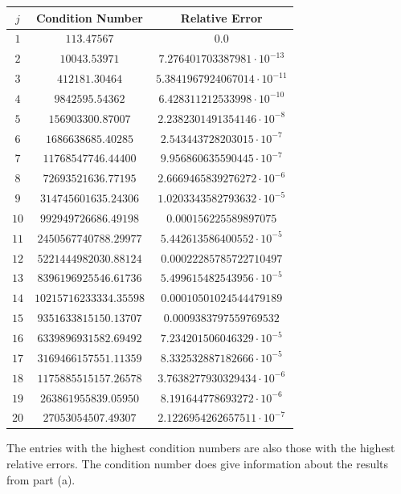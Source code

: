 \documentclass{article}
\begin{document}
\begin{center}
    \begin{tabular}{|c|c|c|}
        \hline
        $j$ & Condition Number & Relative Error \\
        \hline
        $1$ & $113.47567$ & $0.0$ \\
        \hline
        $2$ & $10043.53971$ & $7.276401703387981 \cdot 10^{-13}$ \\
        \hline
        $3$ & $412181.30464$ & $5.3841967924067014 \cdot 10^{-11}$ \\
        \hline
        $4$ & $9842595.54362$ & $6.428311212533998 \cdot 10^{-10}$ \\
        \hline
        $5$ & $156903300.87007$ & $2.2382301491354146 \cdot 10^{-8}$ \\
        \hline
        $6$ & $1686638685.40285$ & $2.543443728203015 \cdot 10^{-7}$ \\
        \hline
        $7$ & $11768547746.44400$ & $9.956860635590445 \cdot 10^{-7}$ \\
        \hline
        $8$ & $72693521636.77195$ & $2.6669465839276272 \cdot 10^{-6}$ \\
        \hline
        $9$ & $314745601635.24306$ & $1.0203343582793632 \cdot 10^{-5}$ \\
        \hline
        $10$ & $992949726686.49198$ & $0.000156225589897075$ \\
        \hline
        $11$ & $2450567740788.29977$ & $5.442613586400552 \cdot 10^{-5}$ \\
        \hline
        $12$ & $5221444982030.88124$ & $0.00022285785722710497$ \\
        \hline
        $13$ & $8396196925546.61736$ & $5.499615482543956 \cdot 10^{-5}$ \\
        \hline
        $14$ & $10215716233334.35598$ & $0.00010501024544479189$ \\
        \hline
        $15$ & $9351633815150.13707$ & $0.0009383797559769532$ \\
        \hline
        $16$ & $6339896931582.69492$ & $7.234201506046329 \cdot 10^{-5}$ \\
        \hline
        $17$ & $3169466157551.11359$ & $8.332532887182666 \cdot 10^{-5}$ \\
        \hline
        $18$ & $1175885515157.26578$ & $3.7638277930329434 \cdot 10^{-6}$ \\
        \hline
        $19$ & $263861955839.05950$ & $8.191644778693272 \cdot 10^{-6}$ \\
        \hline
        $20$ & $27053054507.49307$ & $2.1226954262657511 \cdot 10^{-7}$ \\
        \hline
    \end{tabular}
\end{center}
The entries with the highest condition numbers are also those with the highest relative errors. The condition number does give information about the results from part (a).
\end{document}
